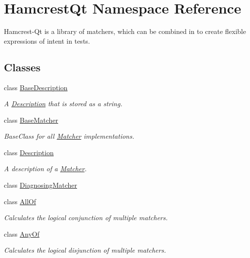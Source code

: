 \hypertarget{namespace_hamcrest_qt}{\section{Hamcrest\-Qt Namespace Reference}
\label{namespace_hamcrest_qt}
}


Hamcrest-\/\-Qt is a library of matchers, which can be combined in to create flexible expressions of intent in tests.  


\subsection*{Classes}
\begin{DoxyCompactItemize}
\item 
class \hyperlink{class_hamcrest_qt_1_1_base_description}{Base\-Description}
\begin{DoxyCompactList}\small\item\em A \hyperlink{class_hamcrest_qt_1_1_description}{Description} that is stored as a string. \end{DoxyCompactList}\item 
class \hyperlink{class_hamcrest_qt_1_1_base_matcher}{Base\-Matcher}
\begin{DoxyCompactList}\small\item\em Base\-Class for all \hyperlink{class_hamcrest_qt_1_1_matcher}{Matcher} implementations. \end{DoxyCompactList}\item 
class \hyperlink{class_hamcrest_qt_1_1_description}{Description}
\begin{DoxyCompactList}\small\item\em A description of a \hyperlink{class_hamcrest_qt_1_1_matcher}{Matcher}. \end{DoxyCompactList}\item 
class \hyperlink{class_hamcrest_qt_1_1_diagnosing_matcher}{Diagnosing\-Matcher}
\item 
class \hyperlink{class_hamcrest_qt_1_1_all_of}{All\-Of}
\begin{DoxyCompactList}\small\item\em Calculates the logical conjunction of multiple matchers. \end{DoxyCompactList}\item 
class \hyperlink{class_hamcrest_qt_1_1_any_of}{Any\-Of}
\begin{DoxyCompactList}\small\item\em Calculates the logical disjunction of multiple matchers. \end{DoxyCompactList}\item 

\end{DoxyCompactItemize}
